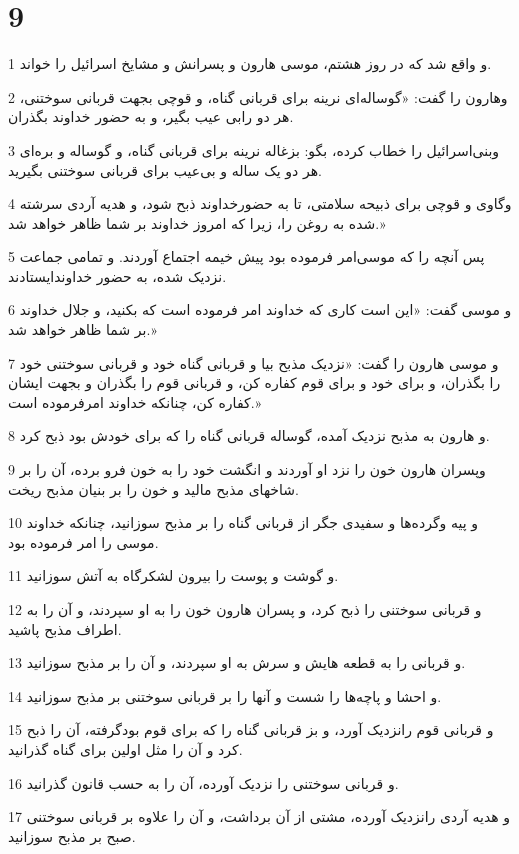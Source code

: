 \chapter{9}

\par 1 و واقع شد که در روز هشتم، موسی هارون و پسرانش و مشایخ اسرائیل را خواند.
\par 2 وهارون را گفت: «گوساله‌ای نرینه برای قربانی گناه، و قوچی بجهت قربانی سوختنی، هر دو رابی عیب بگیر، و به حضور خداوند بگذران.
\par 3 وبنی‌اسرائیل را خطاب کرده، بگو: بزغاله نرینه برای قربانی گناه، و گوساله و بره‌ای هر دو یک ساله و بی‌عیب برای قربانی سوختنی بگیرید.
\par 4 وگاوی و قوچی برای ذبیحه سلامتی، تا به حضورخداوند ذبح شود، و هدیه آردی سرشته شده به روغن را، زیرا که امروز خداوند بر شما ظاهر خواهد شد.»
\par 5 پس آنچه را که موسی‌امر فرموده بود پیش خیمه اجتماع آوردند. و تمامی جماعت نزدیک شده، به حضور خداوندایستادند.
\par 6 و موسی گفت: «این است کاری که خداوند امر فرموده است که بکنید، و جلال خداوند بر شما ظاهر خواهد شد.»
\par 7 و موسی هارون را گفت: «نزدیک مذبح بیا و قربانی گناه خود و قربانی سوختنی خود را بگذران، و برای خود و برای قوم کفاره کن، و قربانی قوم را بگذران و بجهت ایشان کفاره کن، چنانکه خداوند امرفرموده است.»
\par 8 و هارون به مذبح نزدیک آمده، گوساله قربانی گناه را که برای خودش بود ذبح کرد.
\par 9 وپسران هارون خون را نزد او آوردند و انگشت خود را به خون فرو برده، آن را بر شاخهای مذبح مالید و خون را بر بنیان مذبح ریخت.
\par 10 و پیه وگرده‌ها و سفیدی جگر از قربانی گناه را بر مذبح سوزانید، چنانکه خداوند موسی را امر فرموده بود.
\par 11 و گوشت و پوست را بیرون لشکرگاه به آتش سوزانید.
\par 12 و قربانی سوختنی را ذبح کرد، و پسران هارون خون را به او سپردند، و آن را به اطراف مذبح پاشید.
\par 13 و قربانی را به قطعه هایش و سرش به او سپردند، و آن را بر مذبح سوزانید.
\par 14 و احشا و پاچه‌ها را شست و آنها را بر قربانی سوختنی بر مذبح سوزانید.
\par 15 و قربانی قوم رانزدیک آورد، و بز قربانی گناه را که برای قوم بودگرفته، آن را ذبح کرد و آن را مثل اولین برای گناه گذرانید.
\par 16 و قربانی سوختنی را نزدیک آورده، آن را به حسب قانون گذرانید.
\par 17 و هدیه آردی رانزدیک آورده، مشتی از آن برداشت، و آن را علاوه بر قربانی سوختنی صبح بر مذبح سوزانید.
